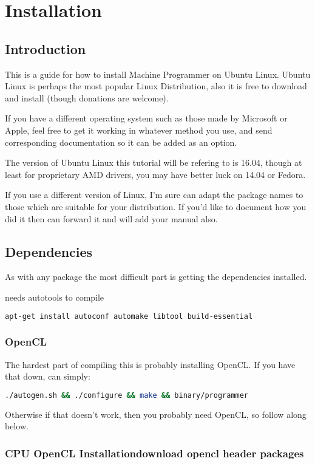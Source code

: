 \documentclass[12pt]{article}
\begin{document}
\chapter{Installation}
\section{Introduction}
This is a guide for how to install Machine Programmer on Ubuntu
Linux\cite{Ubuntu}.
Ubuntu Linux is perhaps the most popular Linux Distribution,
also it is free to download and install (though donations are welcome).

If you have a different operating system such as those made by Microsoft or
Apple, feel free to get it working in whatever method you use, and send
corresponding documentation so it can be added as an option.

The version of Ubuntu Linux this tutorial will be refering to is 16.04,
though at least for proprietary AMD drivers, you may have better luck on 14.04
or Fedora.

If you use a different version of Linux, I'm sure can adapt the package names to
those which are suitable for your distribution.  If you'd like to document how
you did it then can forward it and will add your manual also.

\section{Dependencies}
As with any package the most difficult part is getting the dependencies
installed.

needs autotools to compile
\begin{lstlisting}[language=bash]
apt-get install autoconf automake libtool build-essential
\end{lstlisting}

\subsection{OpenCL}
The hardest part of compiling this is probably installing OpenCL.
If you have that down, can simply:
\begin{lstlisting}[language=bash]
./autogen.sh && ./configure && make && binary/programmer
\end{lstlisting}

Otherwise if that doesn't work, then you probably need OpenCL,
so follow along below.

\subsection{CPU OpenCL Installationdownload opencl header packages}
\end{document}
